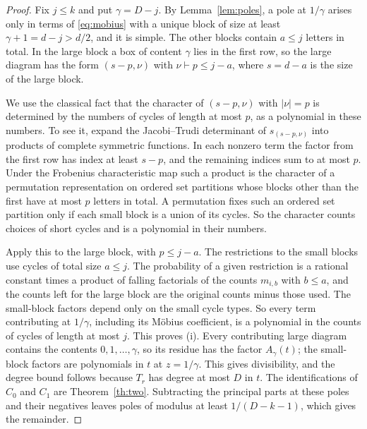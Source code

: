 \documentclass[11pt,a4paper]{article}
\theoremstyle{definition}\newtheorem{definition}[theorem]{Definition}
\theoremstyle{remark}\newtheorem{remark}[theorem]{Remark}\newtheorem{example}[theorem]{Example}
\numberwithin{equation}{section}
\begin{document}
\begin{proof}
Fix $j\le k$ and put $\gamma=D-j$. By Lemma~\ref{lem:poles}, a pole at $1/\gamma$ arises only in terms of \eqref{eq:mobius} with a unique block of size at least $\gamma+1=d-j>d/2$, and it is simple. The other blocks contain $a\le j$ letters in total. In the large block a box of content $\gamma$ lies in the first row, so the large diagram has the form $(s-p,\nu)$ with $\nu\vdash p\le j-a$, where $s=d-a$ is the size of the large block.

We use the classical fact that the character of $(s-p,\nu)$ with $|\nu|=p$ is determined by the numbers of cycles of length at most $p$, as a polynomial in these numbers. To see it, expand the Jacobi--Trudi determinant of $s_{(s-p,\nu)}$ into products of complete symmetric functions. In each nonzero term the factor from the first row has index at least $s-p$, and the remaining indices sum to at most $p$. Under the Frobenius characteristic map such a product is the character of a permutation representation on ordered set partitions whose blocks other than the first have at most $p$ letters in total. A permutation fixes such an ordered set partition only if each small block is a union of its cycles. So the character counts choices of short cycles and is a polynomial in their numbers.

Apply this to the large block, with $p\le j-a$. The restrictions to the small blocks use cycles of total size $a\le j$. The probability of a given restriction is a rational constant times a product of falling factorials of the counts $m_{i,b}$ with $b\le a$, and the counts left for the large block are the original counts minus those used. The small-block factors depend only on the small cycle types. So every term contributing at $1/\gamma$, including its Möbius coefficient, is a polynomial in the counts of cycles of length at most $j$. This proves (i). Every contributing large diagram contains the contents $0,1,\dots,\gamma$, so its residue has the factor $A_\gamma(t)$; the small-block factors are polynomials in $t$ at $z=1/\gamma$. This gives divisibility, and the degree bound follows because $T_r$ has degree at most $D$ in $t$. The identifications of $C_0$ and $C_1$ are Theorem~\ref{th:two}. Subtracting the principal parts at these poles and their negatives leaves poles of modulus at least $1/(D-k-1)$, which gives the remainder.


\end{proof}
\end{document}
